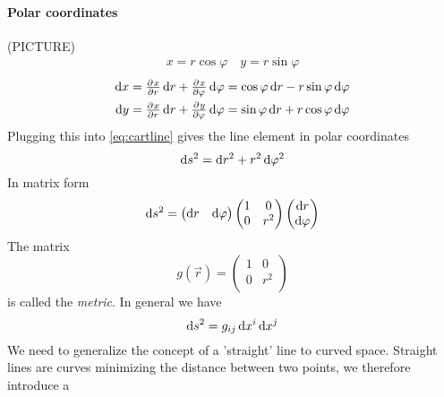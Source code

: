 \paragraph{Polar coordinates}
(PICTURE)
\begin{align*}
x= r\cos\varphi\quad y= r\sin\varphi
\end{align*}
\begin{align*}
\dif x&= \pd{x}{r}\dif r+\pd{x}{\varphi}\dif \varphi = \cos\varphi\dif r-r\sin\varphi\dif \varphi\\
\dif y&= \pd{x}{r}\dif r+\pd{y}{\varphi}\dif \varphi = \sin\varphi\dif r+r\cos\varphi\dif \varphi
\end{align*}
Plugging this into \eqref{eq:cartline} gives the line element in polar coordinates
\begin{equation}
    \dif s^2=\dif r^2+r^2\dif \varphi^2
\end{equation}
In matrix form
\begin{equation}
    \dif s^2=\begin{pmatrix}
\dif r& \dif \varphi
\end{pmatrix}
\begin{pmatrix}
1& 0\\
0& r^2\\
\end{pmatrix}
\begin{pmatrix}
\dif r\\ \dif \varphi
\end{pmatrix}
\end{equation}
The matrix
\begin{equation}
    g(\vec{r})= \begin{pmatrix}
1& 0\\
0& r^2\\
\end{pmatrix}
\end{equation}
is called the \emph{metric}.
In general we have
\begin{equation}
    \dif s^2 = g_{ij}\dif x^i\dif x^j
\end{equation}
We need to generalize the concept of a 'straight' line to curved space. Straight lines are curves minimizing the distance between two points, we therefore introduce a
